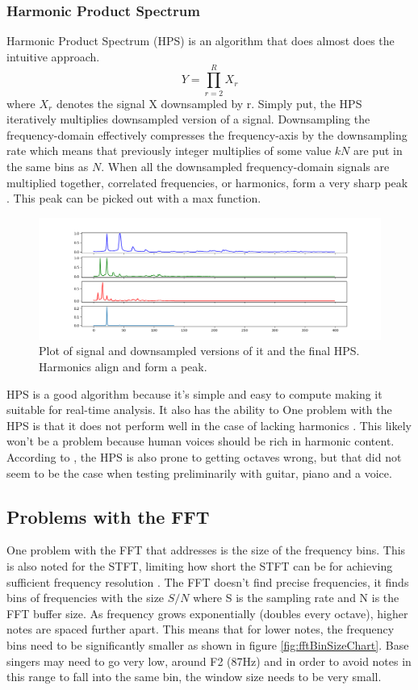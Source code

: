 \subsubsection{Harmonic Product Spectrum}
Harmonic Product Spectrum (HPS) is an algorithm that does almost does the intuitive approach. 
$$Y = \prod_{r=2}^R X_r$$ where $X_r$ denotes the signal X downsampled by r. Simply put, the HPS iteratively multiplies downsampled version of a signal. Downsampling the frequency-domain effectively compresses the frequency-axis by the downsampling rate which means that previously integer multiplies of some value $kN$ are put in the same bins as $N$. When all the downsampled frequency-domain signals are multiplied together, correlated frequencies, or harmonics, form a very sharp peak \cite{McLeod2008}. This peak can be picked out with a max function.

\begin{figure}[ht]
    \centering
    \includegraphics[width=\textwidth]{./images/hps.png}
    \caption{Plot of signal and downsampled versions of it and the final HPS. Harmonics align and form a peak. \label{fig:hps}}
\end{figure}

HPS is a good algorithm because it's simple and easy to compute making it suitable for real-time analysis. It also has the ability to 
One problem with the HPS is that it does not perform well in the case of lacking harmonics \cite{McLeod2008}. This likely won't be a problem because human voices should be rich in harmonic content. According to \cite{Smyth2019}, the HPS is also prone to getting octaves wrong, but that did not seem to be the case when testing preliminarily with guitar, piano and a voice.

\subsection{Problems with the FFT}
One problem with the FFT that   addresses is the size of the frequency bins. This is also noted for the STFT, limiting how short the STFT can be for achieving sufficient frequency resolution . The FFT doesn't find precise frequencies, it finds bins of frequencies with the size $S/N$ where S is the sampling rate and N is the FFT buffer size. As frequency grows exponentially (doubles every octave), higher notes are spaced further apart. This means that for lower notes, the frequency bins need to be significantly smaller as shown in figure \ref{fig:fftBinSizeChart}. Base singers may need to go very low, around F2 (87Hz) and in order to avoid notes in this range to fall into the same bin, the window size needs to be very small.  

